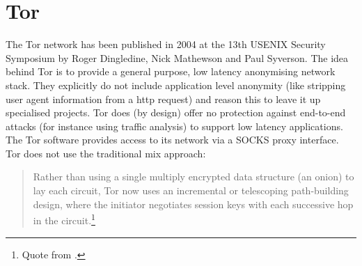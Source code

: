 \section{Tor}
The Tor network has been published in 2004
at the 13th USENIX Security Symposium by Roger Dingledine, 
Nick Mathewson and Paul Syverson.\cite{tor}
The idea behind Tor is to provide a general purpose, 
low latency anonymising network stack.
They explicitly do not include application level anonymity
(like stripping user agent information from a http request) and
reason this to leave it up specialised projects.
Tor does (by design) offer no protection against end-to-end attacks
(for instance using traffic analysis) to support low latency applications.
The Tor software provides access to its network via
a SOCKS proxy interface.
Tor does not use the traditional mix approach:
\begin{quote}
Rather than using a single multiply encrypted
data structure (an onion) to lay each circuit, Tor now uses an
incremental or telescoping path-building design, where the
initiator negotiates session keys with each successive hop in
the circuit.\footnote{Quote from \cite{tor}.}
\end{quote}

